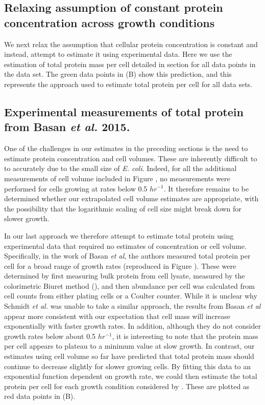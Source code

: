 \subsection{Relaxing assumption of constant protein concentration across growth conditions}
We next relax the assumption that cellular protein concentration is constant and
instead, attempt to  estimate it using experimental data. Here we use the
estimation of total protein mass per cell detailed in section
 for all data points in the
\cite{schmidt2016} data set. The green data points in
(B) show this prediction, and this represents
the approach used to estimate total protein per cell for all data sets.


\subsection{Experimental measurements of total protein from Basan \textit{et al.} 2015.}

One of the challenges in our estimates in the preceding  sections is the need to
estimate protein concentration and cell volumes. These are inherently difficult
to to accurately due to the small size of \textit{E. coli}. Indeed, for all the
additional measurements of cell volume included in Figure
, no measurements were performed for cells growing
at rates below 0.5 $hr^{-1}$. It therefore remains to be determined whether our
extrapolated cell volume estimates are appropriate, with the possibility that
the logarithmic scaling of cell size might break down for slower growth.

In our last approach we therefore attempt to estimate total protein using
experimental data that required  no estimates of concentration or cell volume.
Specifically, in the work of  Basan \textit{et al}, the authors measured total
protein per cell for a broad range of growth rates (reproduced in Figure
). These were determined by first measuring
bulk protein from cell lysate, measured by the colorimetric Biuret method
(\cite{You2013}), and then abundance per cell was calculated from cell counts
from either plating cells or a Coulter counter. While it is unclear why Schmidt
\textit{et al.} was unable to take a similar approach, the results from Basan
\textit{et al} appear more consistent with our expectation that cell mass will
increase exponentially with faster growth rates. In addition, although they do
not consider growth rates below about 0.5 $hr^{-1}$, it is interesting to note
that the protein mass per cell appears to plateau to a minimum value at slow
growth. In contrast, our estimates using cell volume so far have predicted that
total protein mass should continue to decrease slightly for slower growing
cells. By fitting this data to an exponential function dependent on growth rate,
we could then estimate the total protein per cell for each growth condition
considered by \cite{schmidt2016}. These are plotted as red data points in
(B).


